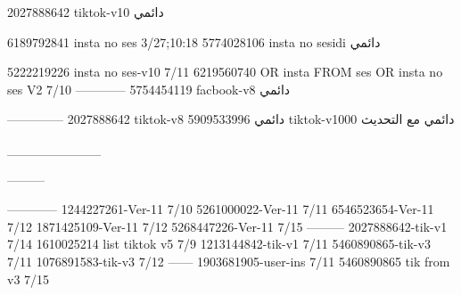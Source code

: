 2027888642 tiktok-v10
دائمي

6189792841 insta no ses
3/27;10:18
5774028106 insta no sesidi
دائمي

5222219226 insta no ses-v10
7/11
6219560740 OR insta FROM ses OR insta no ses V2
7/10
------------
5754454119 facbook-v8
دائمي


--------------
2027888642 tiktok-v8
دائمي
5909533996 tiktok-v1000
دائمي مع التحديث

__________

---------

------------
1244227261-Ver-11
7/10
5261000022-Ver-11
7/11
6546523654-Ver-11
7/12
1871425109-Ver-11
7/12
5268447226-Ver-11
7/15
---------
2027888642-tik-v1
7/14
1610025214 list tiktok v5
7/9
1213144842-tik-v1
7/11
5460890865-tik-v3
7/11
1076891583-tik-v3
7/12
------
1903681905-user-ins
7/11
5460890865 tik from v3
7/15
